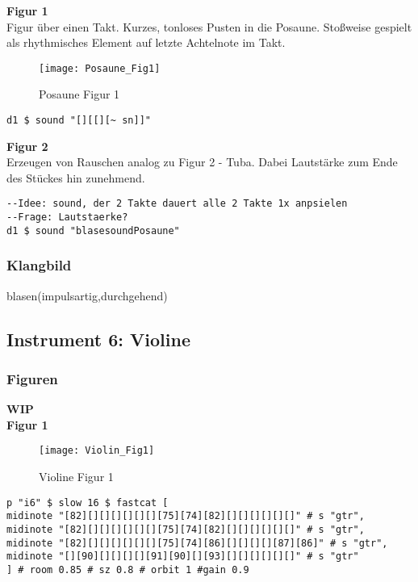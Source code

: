 \documentclass[
10pt, %
a4paper, %
oneside, %
headinclude,footinclude, %
BCOR5mm, %
]{scrartcl}
\begin{document}
\noindent\textbf{Figur 1}\\
Figur über einen Takt. Kurzes, tonloses Pusten in die Posaune. Stoßweise gespielt als rhythmisches Element auf letzte Achtelnote im Takt.\\
\begin{figure}[h]
	\centering 
	\texttt{[image: Posaune\_Fig1]} 
	\caption{Posaune Figur 1}
\end{figure}

\begin{lstlisting}
d1 $ sound "[][[][~ sn]]"
\end{lstlisting}


\noindent\textbf{Figur 2}\\
Erzeugen von Rauschen analog zu Figur 2 - Tuba. Dabei Lautstärke zum Ende des Stückes hin zunehmend.
\begin{lstlisting}
--Idee: sound, der 2 Takte dauert alle 2 Takte 1x anpsielen
--Frage: Lautstaerke?
d1 $ sound "blasesoundPosaune"
\end{lstlisting}

\subsubsection{Klangbild}
blasen(impulsartig,durchgehend)

\subsection{Instrument 6: Violine}
\subsubsection{Figuren}
{\color{orange}\textbf{WIP}} \\
\noindent\textbf{Figur 1}\\
\begin{figure}[h]
	\centering 
	\texttt{[image: Violin\_Fig1]} 
	\caption{Violine Figur 1}
\end{figure}

\begin{lstlisting}
p "i6" $ slow 16 $ fastcat [
midinote "[82][][][][][][][75][74][82][][][][][][]" # s "gtr",
midinote "[82][][][][][][][75][74][82][][][][][][]" # s "gtr",
midinote "[82][][][][][][][75][74][86][][][][][87][86]" # s "gtr",
midinote "[][90][][][][][91][90][][93][][][][][][]" # s "gtr"
] # room 0.85 # sz 0.8 # orbit 1 #gain 0.9
\end{lstlisting}
\end{document}
